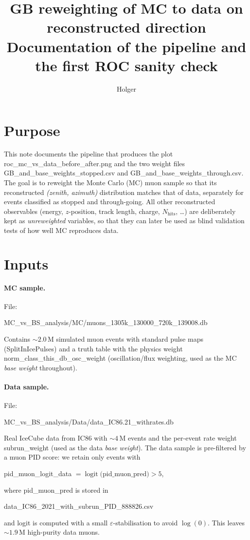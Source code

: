 \documentclass[11pt]{article}
\title{GB reweighting of MC to data on reconstructed direction\\
\large Documentation of the pipeline and the first ROC sanity check}
\author{Holger}
\date{}
\begin{document}
\maketitle

\section*{Purpose}

This note documents the pipeline that produces the plot
roc\_mc\_vs\_data\_before\_after.png and the two weight files
GB\_and\_base\_weights\_stopped.csv and
GB\_and\_base\_weights\_through.csv. The goal is to reweight the
Monte Carlo (MC) muon sample so that its reconstructed
\textit{(zenith, azimuth)} distribution matches that of data, separately for
events classified as stopped and through\nobreakdash-going. All other
reconstructed observables (energy, $z$\nobreakdash-position, track length,
charge, $N_{\text{hits}}$, \dots) are deliberately kept as
\emph{unreweighted} variables, so that they can later be used as blind
validation tests of how well MC reproduces data.

\section{Inputs}

\paragraph{MC sample.}
File:
\begin{center}
MC\_vs\_BS\_analysis/MC/muons\_1305k\_130000\_720k\_139008.db
\end{center}
Contains $\sim 2.0$\,M simulated muon events with standard pulse maps
(SplitInIcePulses) and a truth table with the physics weight
norm\_class\_this\_db\_osc\_weight (oscillation/flux weighting,
used as the MC \emph{base weight} throughout).

\paragraph{Data sample.}
File:
\begin{center}
MC\_vs\_BS\_analysis/Data/data\_IC86.21\_withrates.db
\end{center}
Real IceCube data from IC86 with $\sim 4$\,M events and the per\nobreakdash-event
rate weight subrun\_weight (used as the data \emph{base weight}).
The data sample is pre\nobreakdash-filtered by a muon PID score: we retain only
events with
\begin{center}
pid\_muon\_logit\_data $=\operatorname{logit}\bigl(\text{pid\_muon\_pred}\bigr) > 5$,
\end{center}
where pid\_muon\_pred is stored in
\begin{center}
data\_IC86\_2021\_with\_subrun\_PID\_888826.csv
\end{center}
and logit is computed with a small $\varepsilon$-stabilisation to avoid
$\log(0)$. This leaves $\sim 1.9$\,M high\nobreakdash-purity data muons.
\end{document}
